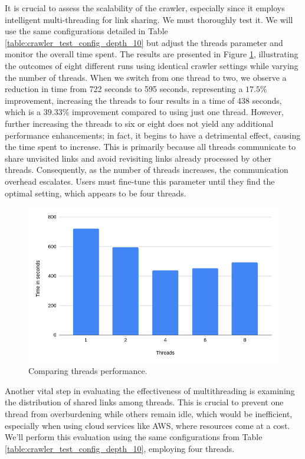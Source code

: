 {It is crucial to assess the scalability of the crawler, especially since it employs intelligent multi-threading for link sharing. We must thoroughly test it. We will use the same configurations detailed in Table \ref{table:crawler_test_config_depth_10} but adjust the threads parameter and monitor the overall time spent. The results are presented in Figure \ref{fig:threads-table}, illustrating the outcomes of eight different runs using identical crawler settings while varying the number of threads.
When we switch from one thread to two, we observe a reduction in time from 722 seconds to 595 seconds, representing a $17.5\%$ improvement, increasing the threads to four results in a time of 438 seconds, which is a $39.33\%$ improvement compared to using just one thread. However, further increasing the threads to six or eight does not yield any additional performance enhancements; in fact, it begins to have a detrimental effect, causing the time spent to increase. This is primarily because all threads communicate to share unvisited links and avoid revisiting links already processed by other threads. Consequently, as the number of threads increases, the communication overhead escalates.
Users must fine-tune this parameter until they find the optimal setting, which appears to be four threads.

\begin{figure}[H]	
     \centering
     \includegraphics[width=13cm]{images/threads-table.png}
     \caption{Comparing threads performance.}
     \label{fig:threads-table}
\end{figure}


Another vital step in evaluating the effectiveness of multithreading is examining the distribution of shared links among threads. This is crucial to prevent one thread from overburdening while others remain idle, which would be inefficient, especially when using cloud services like AWS, where resources come at a cost. We'll perform this evaluation using the same configurations from Table \ref{table:crawler_test_config_depth_10}, employing four threads.

}
